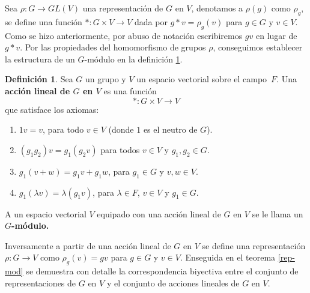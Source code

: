 \documentclass[12pt]{book}
\theoremstyle{definition}
\newtheorem{definition}[theorem]{Definición}
\newcounter{in}
\newcounter{ini}
\begin{document}
Sea $\rho:G\rightarrow GL(V)$ una representación de $G$ en $V$,
denotamos a $\rho(g)$ como $\rho_{g}$, se define una función
$*:G\times V\rightarrow V$ dada por $g*v=\rho_{g}(v)$ para $g\in G$ y
$v\in V$. Como se hizo anteriormente, por abuso de notación escribiremos $gv$ en
lugar de $g*v$. Por las propiedades del homomorfismo de grupos $\rho$,
conseguimos establecer la estructura de un $G$-módulo en la definición
\ref{accion-lineal}.

\begin{definition}
  \label{accion-lineal}
  Sea $G$ un grupo y $V$ un espacio vectorial
  sobre el campo~$F$. Una \textbf{acción lineal de $G$ en $V$} es una
  función $$*:G\times V \rightarrow V $$ que satisface los axiomas:
\begin{enumerate}
\item $1v=v$, para todo $v\in V$ (donde $1$ es el neutro de $G$).
\item $(g_{1}g_{2})v=g_{1}(g_{2}v)$ para todos $v\in V$ y
  $g_{1},g_{2}\in G$.
\item $g_{1}(v+w)=g_{1}v+g_{1}w$, para $g_{1}\in G$ y $v,w \in V .$
\item $g_{1}(\lambda v)=\lambda(g_{1}v)$, para $\lambda \in F$,
  $v\in V$ y $g_{1}\in G.$
\end{enumerate}
A un espacio vectorial $V$ equipado con una acción lineal de $G$
en $V$ se le llama un \textbf{$G$-módulo.}
\end{definition}  

Inversamente a partir de una acción lineal de $G$ en $V$ se define una
representación $\rho:G\rightarrow V$ como $\rho_{g}(v)=gv$ para $g\in
G$ y $v\in V$. Enseguida en el teorema \ref{rep-mod} se demuestra con
detalle la correspondencia biyectiva entre el conjunto de
representaciones de $G$ en $V$ y el conjunto de acciones lineales de
$G$ en $V$.

\end{document}
